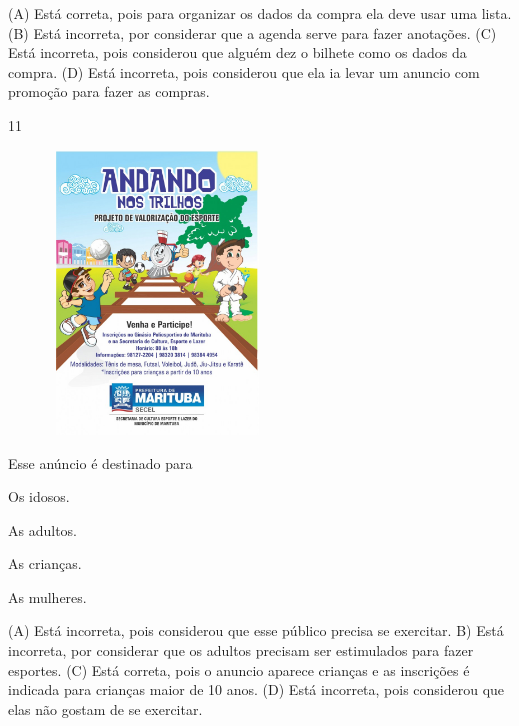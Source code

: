 (A) Está correta, pois para organizar os dados da compra ela deve usar uma lista.
(B) Está incorreta, por considerar que a agenda serve para fazer anotações.
(C) Está incorreta, pois considerou que alguém dez o bilhete como os dados da compra.
(D) Está incorreta, pois considerou que ela ia levar um anuncio com promoção para fazer as compras.

\num{11}

\includegraphics[width=3.11515in,height=2.97237in]{media/image170.jpeg}


Esse anúncio é destinado para

\begin{minipage}{.5\textwidth}
\begin{escolha}
\item Os idosos.

\item As adultos.

\item As crianças.

\item As mulheres.
\end{escolha}
\end{minipage}

(A) Está incorreta, pois considerou que esse público precisa se exercitar.
B) Está incorreta, por considerar que os adultos precisam ser
estimulados para fazer esportes.
(C) Está correta, pois o anuncio aparece crianças e as inscrições é
indicada para crianças maior de 10 anos.
(D) Está incorreta, pois considerou que elas não gostam de se exercitar.

